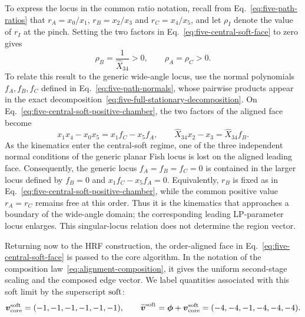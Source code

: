 \documentclass[a4paper,11pt]{article}
\begin{document}
To express the locus in the common ratio notation, recall from
Eq.~\eqref{eq:five-path-ratios} that
\(r_A=x_0/x_1\), \(r_B=x_2/x_3\) and \(r_C=x_4/x_5\), and let
\(\rho_I\) denote the value of \(r_I\) at the pinch.  Setting the two factors
in Eq.~\eqref{eq:five-central-soft-face} to zero gives
\begin{equation}
 \rho_B=\frac{1}{\widehat X_{34}}>0,
 \qquad \rho_A=\rho_C>0.
 \label{eq:five-central-soft-positive-chamber}
\end{equation}
To relate this result to the generic wide-angle locus, use the normal
polynomials \(f_A,f_B,f_C\) defined in
Eq.~\eqref{eq:five-path-normals}, whose pairwise products appear in the exact
decomposition~\eqref{eq:five-full-stationary-decomposition}.  On
Eq.~\eqref{eq:five-central-soft-positive-chamber}, the two factors of the
aligned face become
\begin{equation}
 x_1x_4-x_0x_5=x_1f_C-x_5f_A,\qquad
 \widehat X_{34}x_2-x_3=\widehat X_{34}f_B.
 \label{eq:five-region-ideal-relation-clean}
\end{equation}
As the kinematics enter the central-soft regime, one of the three independent
normal conditions of the generic planar Fish locus is lost on the aligned
leading face.  Consequently, the generic locus \(f_A=f_B=f_C=0\) is
contained in the larger locus defined by \(f_B=0\) and
\(x_1f_C-x_5f_A=0\).  Equivalently, \(r_B\) is fixed as in
Eq.~\eqref{eq:five-central-soft-positive-chamber}, while the common positive
value \(r_A=r_C\) remains free at this order.  Thus it is the kinematics that
approaches a boundary of the wide-angle domain; the corresponding leading
LP-parameter locus enlarges.  This singular-locus relation does not
determine the region vector.

Returning now to the HRF construction, the order-aligned face in
Eq.~\eqref{eq:five-central-soft-face} is passed to the core algorithm.  In the
notation of the composition law~\eqref{eq:alignment-composition}, it gives the
uniform second-stage scaling and the composed edge vector.  We label
quantities associated with this soft limit by the superscript \({\rm soft}\):
\begin{equation}
 \boldsymbol v_{\rm core}^{\rm soft}=(-1,-1,-1,-1,-1,-1),
 \qquad
 \widetilde{\boldsymbol v}^{\rm soft}
 =\boldsymbol\phi+\boldsymbol v_{\rm core}^{\rm soft}
 =(-4,-4,-1,-4,-4,-4).
 \label{eq:five-central-soft-vector}
\end{equation}
\end{document}

